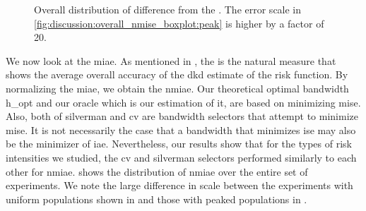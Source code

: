 \begin{figure}[htbp]
\begin{subfigure}[t]{0.45\textwidth}
        \label{fig:discussion:overall_nmise_diff_boxplot:peak}
    \end{subfigure}
    \caption[Overall distribution of  difference from the ]
        {Overall distribution of  difference from the .
            The error scale in \autoref{fig:discussion:overall_nmise_boxplot:peak} is higher by a factor of 20.}
    \label{fig:discussion:overall_nmise_diff_boxplot}
\end{figure}

We now look at the \gls{miae}.
As mentioned in ,
the  is the natural measure that shows the average overall accuracy of the \gls{dkd} estimate of the \gls{risk} function.
By normalizing the \gls{miae}, we obtain the \gls{nmiae}.
Our theoretical optimal bandwidth \gls{h_opt} and our \gls{oracle} which is our estimation of it,
are based on minimizing \gls{mise}.
Also, both of \gls{silverman} and \gls{cv} are bandwidth selectors that attempt to minimize \gls{mise}.
It is not necessarily the case that a bandwidth that minimizes \gls{ise} may also be the minimizer of \gls{iae}.
Nevertheless, our results show that for the types of \gls{risk} intensities we studied,
the \gls{cv} and \gls{silverman} selectors performed similarly to each other for \gls{nmiae}.
 shows the distribution of \gls{nmiae} over the entire set of experiments.
We note the large difference in scale between the experiments with uniform populations shown in  and those with peaked populations in .


